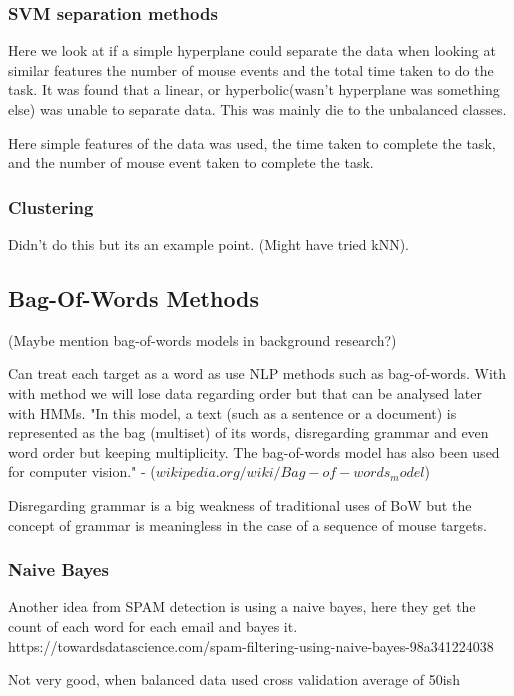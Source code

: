 \documentclass{article}
\begin{document}
\subsubsection{SVM separation methods}
Here we look at if a simple hyperplane could separate the data when looking at similar features the number of mouse events and the total time taken to do the task. 
It was found that a linear, or hyperbolic(wasn't hyperplane was something else) was unable to separate data. 
This was mainly die to the unbalanced classes.

Here simple features of the data was used, the time taken to complete the task, and the number of mouse event taken to complete the task.


\subsubsection{Clustering}
Didn't do this but its an example point.
(Might have tried kNN).

\subsection{Bag-Of-Words Methods}

(Maybe mention bag-of-words models in background research?)

Can treat each target as a word as use NLP methods such as bag-of-words. 
With with method we will lose data regarding order but that can be analysed later with HMMs.
"In this model, a text (such as a sentence or a document) is represented as the bag (multiset) of its words,
 disregarding grammar and even word order but keeping multiplicity.
  The bag-of-words model has also been used for computer vision." 
  - ($wikipedia.org/wiki/Bag-of-words_model$)

Disregarding grammar is a big weakness of traditional uses of BoW but the concept of grammar is meaningless in the case of a sequence of mouse targets.

\subsubsection{Naive Bayes}

Another idea from SPAM detection is using a naive bayes, here they get the count of each word for each email and bayes it. 
 https://towardsdatascience.com/spam-filtering-using-naive-bayes-98a341224038

Not very good, when balanced data used cross validation average of 50ish%
\end{document}
